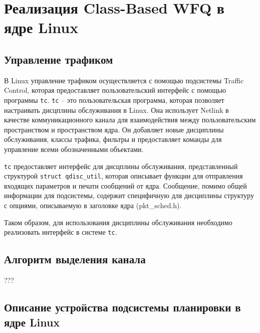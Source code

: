 \section{Реализация Class-Based WFQ в ядре Linux}

	\subsection{Управление трафиком}


	В Linux управление трафиком осуществляется с помощью подсистемы Traffic Control,
	которая предоставляет пользовательский интерфейс с помощью программы \texttt{tc}.
	\texttt{tc} -- это пользовательская программа, которая позволяет настраивать
	дисцплины обслуживания в Linux. Она использует Netlink в качестве
	коммуникационного канала для взаимодействия между пользовательским
	пространством и пространством ядра. Он добавляет новые дисциплины
	обслуживания, классы трафика, фильтры и предоставляет команды для
	управление всеми обозначенными объектами.

	\texttt{tc} предоставляет интерфейс для дисцплины обслуживания,
	представленный структурой \lstinline{struct qdisc_util}, которая
	описывает функции для отправления входящих параметров и печати
	сообщений от ядра. Сообщение, помимо общей информации для подсистемы,
	содержит специфичную для дисциплины структуру с опциями, описываемую
	в заголовке ядра (pkt\_sched.h). 

	Таком образом, для использования дисциплины обслуживания необходимо
	реализовать интерфейс в системе \texttt{tc}. 

	\subsection{Алгоритм выделения канала} 

	???

	\subsection{Описание устройства подсистемы планировки в ядре Linux}



